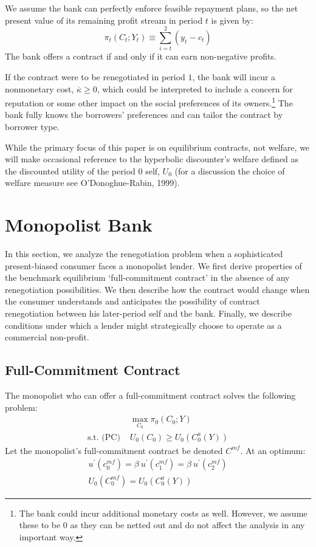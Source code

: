 \documentclass[11pt]{article}%
\begin{document}
We assume the bank can perfectly enforce feasible repayment plans, so the net present value
of its remaining profit stream in period $t$ is given by:%
\[
\pi_{t}\left(  C_{t};Y_{t}\right)  \equiv\sum\limits_{i=t}^{2}\left(
y_{t}_{}-c_{t}\right)   
\]
The bank offers a contract if and only
if it can earn non-negative profits.

If the contract were to be renegotiated in period $1$, the bank will incur a
nonmonetary cost, $\overline{\kappa}\geq0$, which could be interpreted to
include a concern for reputation or some other impact on the social
preferences of its owners.\footnote{The bank could incur additional monetary
costs as well. However, we assume these to be $0$ as they can be netted out
and do not affect the analysis in any important way.} The bank fully knows the
borrowers' preferences and can tailor the contract by borrower type.

While the primary focus of this paper is on equilibrium contracts, not
welfare, we will make occasional reference to the hyperbolic discounter's
welfare  defined as the
discounted utility of the period $0$ self, $U_{0}$ (for a discussion the choice of welfare measure see O'Donoghue-Rabin, 1999).


\section{Monopolist Bank}

In this section, we analyze the renegotiation problem when a sophisticated
present-biased consumer faces a monopolist lender. We first derive properties
of the benchmark equilibrium `full-commitment contract' in the absence of any
renegotiation possibilities. We then describe how the contract would change
when the consumer understands and anticipates the possibility of contract
renegotiation between his later-period self and the bank. Finally, we describe
conditions under which a lender might strategically choose to operate as a
commercial non-profit.

\subsection{Full-Commitment Contract}


The monopolist who can offer a full-commitment contract solves the following
problem:
\begin{align*}
&  \max_{C_{0}}\pi_{0}\left(  C_{0};Y\right) \\
\text{s.t. (PC) }  &  U_{0}\left(  C_{0}\right)  \geq U_{0}\left(  C_{0}%
^{a}(Y)\right)
\end{align*}
Let the monopolist's full-commitment contract be denoted $C^{mf}$. At an optimum:
\begin{align}
  u^{\prime}\left(  c_{0}^{mf}\right)  =\beta\ u^{\prime}\left(  c_{1}
^{mf}\right)  =\beta\ u^{\prime}\left(  c_{2}^{mf}\right) \label{foc-monop}\\
  U_{0}\left(  C_{0}^{mf}\right)  =U_{0}\left(  C_{0}^{a}(Y)\right)
\label{BPC-monop}
\end{align}
\end{document}
